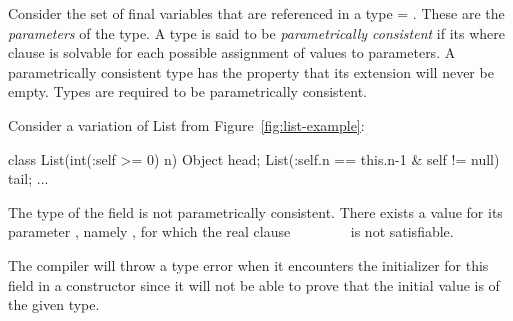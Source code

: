 Consider the set of final variables that are referenced in a
type  = . These are the {\em parameters} of
the type. A type is said to be {\em parametrically consistent}
if its where clause  is solvable for each possible assignment of
values to parameters.  A parametrically consistent type has the
property that its extension will never be empty. 
Types are required to be parametrically consistent.

Consider  a variation of List from Figure~\ref{fig:list-example}:
\begin{displayxten}
class List(int(:self >= 0) n) {
  Object head;
  List(:self.n == this.n-1 & self != null) tail;
  ...
}
\end{displayxten}
The type of the field  is not parametrically
consistent. There exists a value for its parameter , namely
, for which the real clause ~\xcd{!=}~ \xcd{&}
~\xcd{==}~ \xcd{&}
~\xcd{>=}~ is not satisfiable.

The compiler will throw a type error when it encounters the
initializer for this field in a constructor since it will not be able
to prove that the initial value is of the given type.


